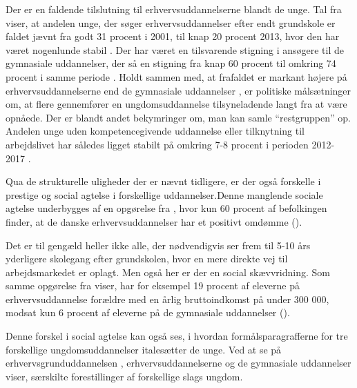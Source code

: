 Der er en faldende tilslutning til erhvervsuddannelserne blandt de unge.
Tal fra \citeauthor{borne-ogundervisningsministerietHvemOgHvor} viser, at andelen unge, der søger erhvervsuddannelser efter endt grundskole er faldet jævnt fra godt 31 procent i 2001, til knap 20 procent 2013, hvor den har været nogenlunde stabil \autocite[s. 6]{borne-ogundervisningsministerietHvemOgHvor}.
Der har været en tilsvarende stigning i ansøgere til de gymnasiale uddannelser, der så en stigning fra knap 60 procent til omkring 74 procent i samme periode \autocite[s 5f]{undervisningsministerietOg10Klasseelevernes2017}.
Holdt sammen med, at frafaldet er markant højere på erhvervsuddannelserne end de gymnasiale uddannelser \autocite{danskegymnasierFuldforelseOgKarakterer2019}, er politiske målsætninger om, at flere gennemfører en ungdomsuddannelse tilsyneladende langt fra at være opnåede.
Der er blandt andet bekymringer om, man kan samle “restgruppen” op.
Andelen unge uden kompetencegivende uddannelse eller tilknytning til arbejdslivet har således ligget stabilt på omkring 7-8 procent i perioden 2012-2017 \autocite[s. 9]{andersenUngeUdenUddannelse2019}.

Qua de strukturelle uligheder der er nævnt tidligere, er der også forskelle i prestige og social agtelse i forskellige uddannelser.Denne manglende sociale agtelse underbygges af en opgørelse fra \citeauthor{danmarksstatistikErhvervsuddannelserDanmark20192019}, hvor kun 60 procent af befolkingen finder, at de danske erhvervsuddannelser har et positivt omdømme (\citeyear[s. 7]{danmarksstatistikErhvervsuddannelserDanmark20192019}).

Det er til gengæld heller ikke alle, der nødvendigvis ser frem til 5-10 års yderligere skolegang efter grundskolen, hvor en mere direkte vej til arbejdsmarkedet er oplagt.
Men også her er der en social skævvridning.
Som samme opgørelse fra \citeauthor{danmarksstatistikErhvervsuddannelserDanmark20192019} viser, har for eksempel 19 procent af eleverne på erhvervsuddannelse forældre med en årlig bruttoindkomst på under 300 000, modsat kun 6 procent af eleverne på de gymnasiale uddannelser (\citeyear[s. 6]{danmarksstatistikErhvervsuddannelserDanmark20192019}). 

Denne forskel i social agtelse kan også ses, i hvordan formålsparagrafferne for tre forskellige ungdomsuddannelser italesætter de unge. Ved at se på erhvervsgrunduddannelsen \autocite[§ 1]{uddannelsesministerietBekendtgorelseAfLov2016a}, erhvervsuddannelserne \autocite[§1, stk.2]{uddannelsesministerietBekendtgorelseAfLov2020} og de gymnasiale uddannelser \autocite[§1]{uddannelsesministerietBekendtgorelseAfLov2019} viser, særskilte forestillinger af forskellige slags ungdom.

